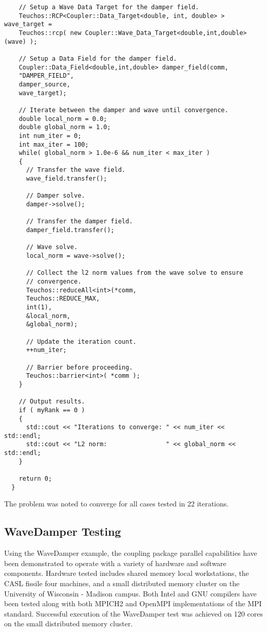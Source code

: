 \documentclass[letterpaper]{article}
\begin{document}
\begin{lstlisting}
    // Setup a Wave Data Target for the damper field.
    Teuchos::RCP<Coupler::Data_Target<double, int, double> > wave_target = 
    Teuchos::rcp( new Coupler::Wave_Data_Target<double,int,double>(wave) );

    // Setup a Data Field for the damper field.
    Coupler::Data_Field<double,int,double> damper_field(comm,
    "DAMPER_FIELD",
    damper_source,
    wave_target);

    // Iterate between the damper and wave until convergence.
    double local_norm = 0.0;
    double global_norm = 1.0;
    int num_iter = 0;
    int max_iter = 100;
    while( global_norm > 1.0e-6 && num_iter < max_iter )
    {
      // Transfer the wave field.
      wave_field.transfer();

      // Damper solve.
      damper->solve();

      // Transfer the damper field.
      damper_field.transfer();

      // Wave solve.
      local_norm = wave->solve();

      // Collect the l2 norm values from the wave solve to ensure
      // convergence. 
      Teuchos::reduceAll<int>(*comm,
      Teuchos::REDUCE_MAX, 
      int(1), 
      &local_norm, 
      &global_norm);

      // Update the iteration count.
      ++num_iter;

      // Barrier before proceeding.
      Teuchos::barrier<int>( *comm );
    }

    // Output results.
    if ( myRank == 0 )
    {
      std::cout << "Iterations to converge: " << num_iter << std::endl;
      std::cout << "L2 norm:                " << global_norm << std::endl;
    }

    return 0;
  }
\end{lstlisting}

The problem was noted to converge for all cases tested in 22 iterations.

\subsection{WaveDamper Testing}

Using the WaveDamper example, the coupling package parallel
capabilities have been demonstrated to operate with a variety of
hardware and software components. Hardware tested includes shared
memory local workstations, the CASL fissile four machines, and a small
distributed memory cluster on the University of Wisconsin - Madison
campus. Both Intel and GNU compilers have been tested along with both
MPICH2 and OpenMPI implementations of the MPI standard. Successful
execution of the WaveDamper test was achieved on 120 cores on the
small distributed memory cluster.
\end{document}
